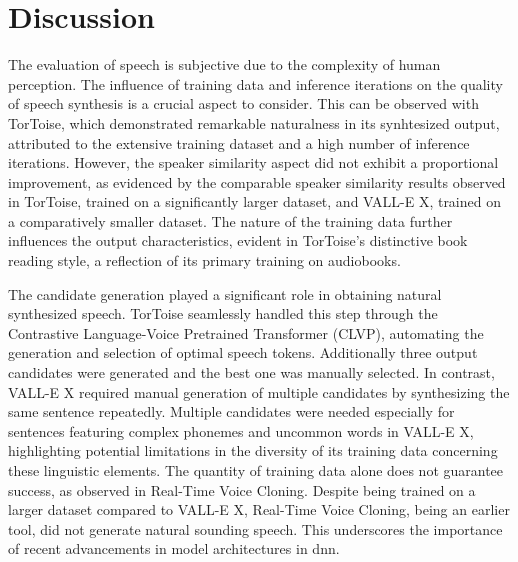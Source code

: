 \newpage
\section{Discussion}

The evaluation of speech is subjective due to the complexity of human perception. The influence of training data and inference iterations on the quality of speech synthesis is a crucial aspect to consider. This can be observed with TorToise, which demonstrated remarkable naturalness in its synhtesized output, attributed to the extensive training dataset and a high number of inference iterations. However, the speaker similarity aspect did not exhibit a proportional improvement, as evidenced by the comparable speaker similarity results observed in TorToise, trained on a significantly larger dataset, and VALL-E X, trained on a comparatively smaller dataset. The nature of the training data further influences the output characteristics, evident in TorToise's distinctive book reading style, a reflection of its primary training on audiobooks.

The candidate generation played a significant role in obtaining natural synthesized speech. TorToise seamlessly handled this step through the Contrastive Language-Voice Pretrained Transformer (CLVP), automating the generation and selection of optimal speech tokens. Additionally three output candidates were generated and the best one was manually selected. In contrast, VALL-E X required manual generation of multiple candidates by synthesizing the same sentence repeatedly. Multiple candidates were needed especially for sentences featuring complex phonemes and uncommon words in VALL-E X, highlighting potential limitations in the diversity of its training data concerning these linguistic elements.
The quantity of training data alone does not guarantee success, as observed in Real-Time Voice Cloning. Despite being trained on a larger dataset compared to VALL-E X, Real-Time Voice Cloning, being an earlier tool, did not generate natural sounding speech. This underscores the importance of recent advancements in model architectures in \gls{dnn}.


